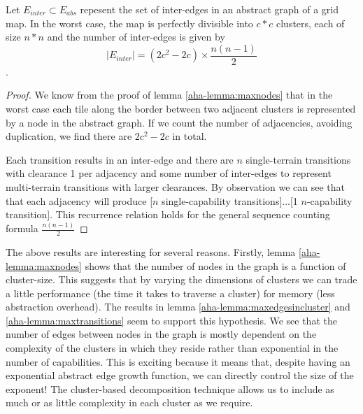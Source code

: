 \begin{lemma}
\label{aha-lemma:maxtransitions}
Let $E_{inter} \subset E_{abs}$ repesent the set of inter-edges in an abstract graph of a grid map. In the worst case, the map is perfectly divisible into $c*c$ clusters, each of size $n*n$ and the number of inter-edges is given by 
$$|E_{inter}| = (2c^2 - 2c)\times \frac{n(n-1)}{2}$$.
\end{lemma}

\begin{proof}
We know from the proof of lemma \ref{aha-lemma:maxnodes} that in the worst case each tile along the border between two adjacent clusters is represented by a node in the abstract graph. 
If we count the number of adjacencies, avoiding duplication, we find there are $2c^2 - 2c$ in total.
\par \indent
Each transition results in an inter-edge and there are $n$ single-terrain transitions with clearance 1 per adjacency and some number of inter-edges to represent multi-terrain transitions with larger clearances. 
By observation we can see that that each adjacency will produce [$n$ single-capability transitions]...[1 $n$-capability transition]. 
This recurrence relation holds for the general sequence counting formula $\frac{n(n-1)}{2}$
\end{proof}

The above results are interesting for several reasons. 
Firstly, lemma \ref{aha-lemma:maxnodes} shows that the number of nodes in the graph is a function of cluster-size. This suggests that by varying the dimensions of clusters we can trade a little performance (the time it takes to traverse a cluster) for memory (less abstraction overhead).
The results in lemma \ref{aha-lemma:maxedgesincluster} and \ref{aha-lemma:maxtransitions} seem to support this hypothesis. 
We see that the number of edges between nodes in the graph is mostly dependent on the complexity of the clusters in which they reside rather than exponential in the number of capabilities. 
This is exciting because it means that, despite having an exponential abstract edge growth function, we can directly control the size of the exponent! 
The cluster-based decomposition technique allows us to include as much or as little complexity in each cluster as we require.

